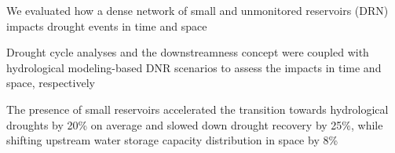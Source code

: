 \documentclass[draft]{agujournal2019}
\begin{document}





\begin{keypoints}
\item We evaluated how a dense network of small and unmonitored reservoirs (DRN) impacts drought events in time and space
\item Drought cycle analyses and the downstreamness concept were coupled with hydrological modeling-based DNR scenarios to assess the impacts in time and space, respectively
\item The presence of small reservoirs accelerated the transition towards hydrological droughts by 20\% on average and slowed down drought recovery by 25\%, while shifting upstream water storage capacity distribution in space by 8\%
\end{keypoints}

%
%

%
%
\end{document}

